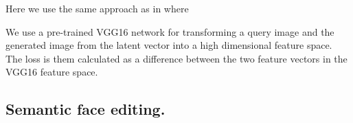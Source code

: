 Here we use the same approach as in \cite{styletransfer} where



We use a pre-trained VGG16 network for transforming a query image and the generated image from the latent vector into a high dimensional feature space. The loss is them calculated as a difference between the two feature vectors in the VGG16 feature space.



%



\subsection{Semantic face editing.}
